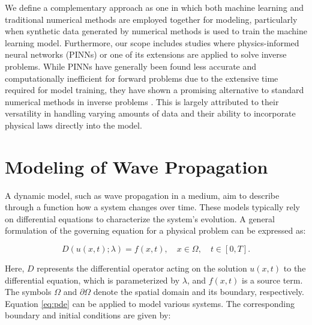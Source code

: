 \documentclass[11pt,twoside]{article}
\begin{document}
\vspace*{2mm}

We define a complementary approach as one in which both machine learning and traditional numerical methods are employed 
together for modeling, particularly when synthetic data generated by numerical methods is used to train the machine learning 
model. Furthermore, our scope includes studies where physics-informed neural networks (PINNs) or one of its extensions are
applied to solve inverse problems. While PINNs have generally been found less accurate and computationally inefficient for 
forward problems due to the extensive time required for model training, they have shown a promising alternative to standard 
numerical methods in inverse problems \citep{haghighat_physics-informed_2021, raissi_hidden_2020, hao_physics-informed_2023}. 
This is largely attributed to their versatility in handling varying amounts of data and their ability to incorporate 
physical laws directly into the model.

\section{Modeling of Wave Propagation}\label{sec:modeling_wave_propagation}

A dynamic model, such as wave propagation in a medium, aim to describe through a function how a system changes over time. 
These models typically rely on differential equations to characterize the system's evolution. A general formulation of 
the governing equation for a physical problem can be expressed as:

\begin{equation*}
D(u(x,t); \lambda) = f(x,t), \quad x \in \Omega, \quad t \in [0, T] .\label{eq:pde}
\end{equation*}
 
Here, $D$ represents the differential operator acting on the solution $u(x,t)$ to the differential equation, which is 
parameterized by $\lambda$, and $f(x,t)$ is a source term. The symbols $\Omega$ and $\partial\Omega$ denote the spatial 
domain and its boundary, respectively. Equation \ref{eq:pde} can be applied to model various systems. The corresponding 
boundary and initial conditions are given by:
\end{document}
